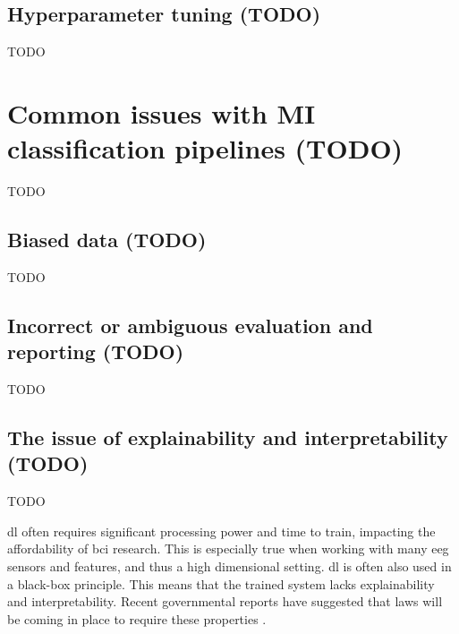 
\subsection{Hyperparameter tuning (TODO)}
\label{subsec:processing_signals_evaluating_and_using_hyperparameter_tuning}

TODO


\section{Common issues with MI classification pipelines (TODO)}
\label{sec:processing_signals_common_issues}

TODO


\subsection{Biased data (TODO)}
\label{subsec:processing_signals_common_issues_bias}

TODO


\subsection{Incorrect or ambiguous evaluation and reporting (TODO)}
\label{subsec:processing_signals_common_issues_generalisation}

TODO


\subsection{The issue of explainability and interpretability (TODO)}
\label{subsec:processing_signals_common_issues_exaplainable}

TODO

\Gls{dl} often requires significant processing power and time to train, impacting the affordability of \gls{bci} research.
This is especially true when working with many \gls{eeg} sensors and features, and thus a high dimensional setting. 
\Gls{dl} is often also used in a black-box principle.
This means that the trained system lacks explainability and interpretability.
Recent governmental reports have suggested that laws will be coming in place to require these properties \citep{eu_ai_blackbox_report, explainable_ai_policy}.

